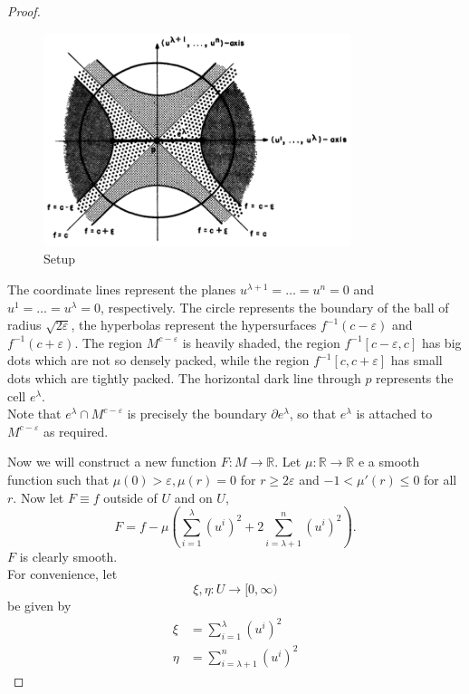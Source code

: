 \documentclass[reqno]{amsart}
\theoremstyle{definition}
\theoremstyle{remark}
\begin{document}
\begin{proof}
        \begin{figure}[htpb]
            \centering
            \includegraphics[width=0.8\textwidth]{3214255.png}
            \caption{Setup}
            \label{fig:3214255-png}
        \end{figure}
        The coordinate lines represent the planes
        $u^{\lambda+1} = \ldots = u^{n} = 0$ and
        $u^{1} = \ldots = u^{\lambda} = 0$, respectively.
        The circle represents the boundary of the ball of
        radius $\sqrt{2 \varepsilon} $, the
        hyperbolas represent the hypersurfaces
        $f^{-1}\left( c - \varepsilon \right) $ and
        $f^{-1}\left( c+\varepsilon \right) $. The
        region $M^{c-\varepsilon}$ is heavily shaded,
        the region $f^{-1}\left[ c-\varepsilon, c \right] $ 
        has big dots which are not so densely packed, while
        the region $f^{-1}\left[ c , c +\varepsilon \right] $ 
        has small dots which are tightly packed.
        The horizontal dark line through $p$ represents
        the cell $e^{\lambda}$.\\
        Note that $e^{\lambda} \cap
        M^{c- \varepsilon}$ is precisely the boundary
        $\partial e^{\lambda}$, so
        that $e^{\lambda}$ is attached to
        $M^{c -\varepsilon}$ as required.\\
        \linebreak

        Now we will construct a new function
        $F \colon M \to \mathbb{R}$. Let
        $\mu \colon \mathbb{R} \to \mathbb{R}$ e
        a smooth function such that
        $\mu (0) > \varepsilon,
        \mu (r) = 0$ for $r \ge 2 \varepsilon$ and
        $-1 < \mu'(r) \le 0$ for all $r$.
        Now let $F \equiv f$ outside of $U$ and
        on $U$,
        \[
        F = f - \mu \left( \sum_{i=1}^{\lambda}
        \left( u^{i} \right)^2 +
    2 \sum_{i=\lambda+1}^{n} \left( u^{i} \right)^2\right).
        \] 
        $F$ is clearly smooth.\\
        For convenience, let
        \[
        \xi, \eta \colon U \to [0,\infty)
        \] 
        be given by
        \begin{align*}
            \xi &= \sum_{i=1}^{\lambda}\left( u^{i} \right)^2\\
            \eta &= \sum_{i=\lambda+1}^{n} \left( u^{i} \right)^2
        \end{align*}


\end{proof}
\end{document}

